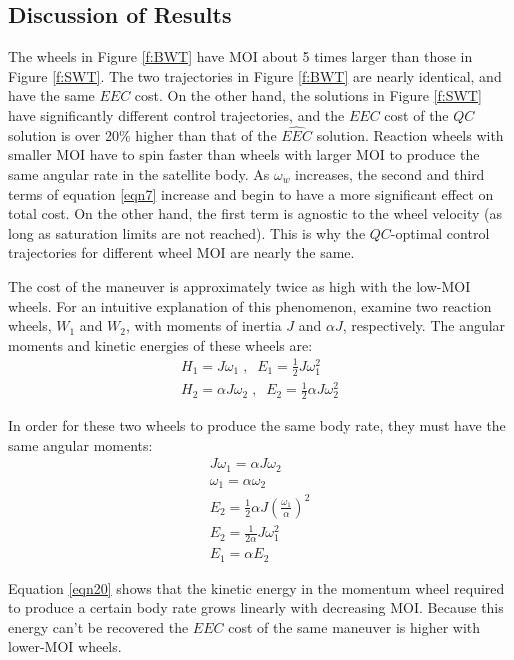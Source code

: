 \documentclass[letterpaper, paper,11pt]{AAS}
\begin{document}
\subsection{Discussion of Results}
The wheels in Figure \ref{f:BWT} have MOI about 5 times larger than those in Figure \ref{f:SWT}. The two trajectories in Figure \ref{f:BWT} are nearly identical, and have the same $EEC$ cost. On the other hand, the solutions in Figure \ref{f:SWT} have significantly different control trajectories, and the $EEC$ cost of the $QC$ solution is over 20$\%$ higher than that of the $\hat{EEC}$ solution. Reaction wheels with smaller MOI have to spin faster than wheels with larger MOI to produce the same angular rate in the satellite body. As $\omega _w$ increases, the second and third terms of equation \ref{eqn7} increase and begin to have a more significant effect on total cost. On the other hand, the first term is agnostic to the wheel velocity (as long as saturation limits are not reached). This is why the $QC$-optimal control trajectories for different wheel MOI are nearly the same.

The cost of the maneuver is approximately twice as high with the low-MOI wheels. For an intuitive explanation of this phenomenon, examine two reaction wheels, $W_1$ and $W_2$, with moments of inertia $J$ and $\alpha J$, respectively. The angular moments and kinetic energies of these wheels are:
\begin{align}
H_1 = J\omega_1 \;, \; \; E_1 = \frac{1}{2}J\omega_1^2 \\
H_2 = \alpha J \omega_2 \;, \; \; E_2 = \frac{1}{2}\alpha J \omega_2^2
\end{align}

\noindent In order for these two wheels to produce the same body rate, they must have the same angular moments:
\begin{align}
J\omega_1 = \alpha J \omega_2 \\
\omega_1 = \alpha\omega_2 \\
E_2 = \frac{1}{2} \alpha J (\frac{\omega_1}{\alpha})^2 \\
E_2 = \frac{1}{2\alpha} J \omega_1^2 \\
\label{eqn20}
E_1 = \alpha E_2
\end{align}

\noindent Equation \ref{eqn20} shows that the kinetic energy in the momentum wheel required to produce a certain body rate grows linearly with decreasing MOI. Because this energy can't be recovered the $EEC$ cost of the same maneuver is higher with lower-MOI wheels.
\end{document}
